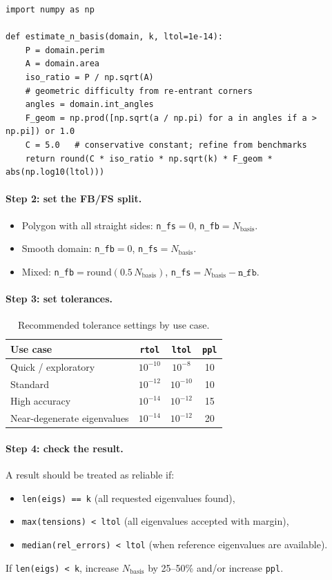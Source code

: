 \documentclass[11pt]{article}
\newcommand{\Nbasis}{N_{\mathrm{basis}}}
\newcommand{\ltol}{\texttt{ltol}}
\newcommand{\rtol}{\texttt{rtol}}
\newcommand{\ppl}{\texttt{ppl}}
\begin{document}
\begin{lstlisting}
import numpy as np

def estimate_n_basis(domain, k, ltol=1e-14):
    P = domain.perim
    A = domain.area
    iso_ratio = P / np.sqrt(A)
    # geometric difficulty from re-entrant corners
    angles = domain.int_angles
    F_geom = np.prod([np.sqrt(a / np.pi) for a in angles if a > np.pi]) or 1.0
    C = 5.0   # conservative constant; refine from benchmarks
    return round(C * iso_ratio * np.sqrt(k) * F_geom * abs(np.log10(ltol)))
\end{lstlisting}

\paragraph{Step 2: set the FB/FS split.}
\begin{itemize}
  \item Polygon with all straight sides: \texttt{n\_fs}$=0$, \texttt{n\_fb}$=\Nbasis$.
  \item Smooth domain: \texttt{n\_fb}$=0$, \texttt{n\_fs}$=\Nbasis$.
  \item Mixed: \texttt{n\_fb}$=\mathrm{round}(0.5\,\Nbasis)$,
    \texttt{n\_fs}$=\Nbasis-\texttt{n\_fb}$.
\end{itemize}

\paragraph{Step 3: set tolerances.}

\begin{table}[h]
\centering
\begin{tabular}{lccc}
\toprule
Use case & \rtol & \ltol & \ppl \\
\midrule
Quick / exploratory         & $10^{-10}$ & $10^{-8}$  & 10 \\
Standard                    & $10^{-12}$ & $10^{-10}$ & 10 \\
High accuracy               & $10^{-14}$ & $10^{-12}$ & 15 \\
Near-degenerate eigenvalues & $10^{-14}$ & $10^{-12}$ & 20 \\
\bottomrule
\end{tabular}
\caption{Recommended tolerance settings by use case.}
\end{table}

\paragraph{Step 4: check the result.}
A result should be treated as reliable if:
\begin{itemize}
  \item \texttt{len(eigs) == k} (all requested eigenvalues found),
  \item \texttt{max(tensions) < ltol} (all eigenvalues accepted with margin),
  \item \texttt{median(rel\_errors) < ltol} (when reference eigenvalues are
    available).
\end{itemize}
If \texttt{len(eigs) < k}, increase $\Nbasis$ by 25--50\% and/or increase
\ppl.
\end{document}
